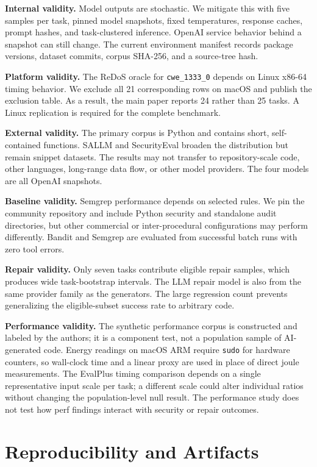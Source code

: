 \documentclass[sigconf,nonacm]{acmart}
\begin{document}
\textbf{Internal validity.} Model outputs are stochastic. We mitigate this with
five samples per task, pinned model snapshots, fixed temperatures, response
caches, prompt hashes, and task-clustered inference. OpenAI service behavior
behind a snapshot can still change. The current environment manifest records
package versions, dataset commits, corpus SHA-256, and a source-tree hash.

\textbf{Platform validity.} The ReDoS oracle for \texttt{cwe\_1333\_0} depends
on Linux x86-64 timing behavior. We exclude all 21 corresponding rows on macOS
and publish the exclusion table. As a result, the main paper reports 24 rather
than 25 tasks. A Linux replication is required for the complete benchmark.

\textbf{External validity.} The primary corpus is Python and contains short,
self-contained functions. SALLM and SecurityEval broaden the distribution but
remain snippet datasets. The results may not transfer to repository-scale
code, other languages, long-range data flow, or other model providers. The four
models are all OpenAI snapshots.

\textbf{Baseline validity.} Semgrep performance depends on selected rules. We
pin the community repository and include Python security and standalone audit
directories, but other commercial or inter-procedural configurations may
perform differently. Bandit and Semgrep are evaluated from successful batch
runs with zero tool errors.

\textbf{Repair validity.} Only seven tasks contribute eligible repair samples,
which produces wide task-bootstrap intervals. The LLM repair model is also from
the same provider family as the generators. The large regression count prevents
generalizing the eligible-subset success rate to arbitrary code.

\textbf{Performance validity.} The synthetic performance corpus is constructed
and labeled by the authors; it is a component test, not a population sample of
AI-generated code. Energy readings on macOS ARM require \texttt{sudo} for
hardware counters, so wall-clock time and a linear proxy are used in place of
direct joule measurements. The EvalPlus timing comparison depends on a single
representative input scale per task; a different scale could alter individual
ratios without changing the population-level null result. The performance study
does not test how perf findings interact with security or repair outcomes.

\section{Reproducibility and Artifacts}
\end{document}
